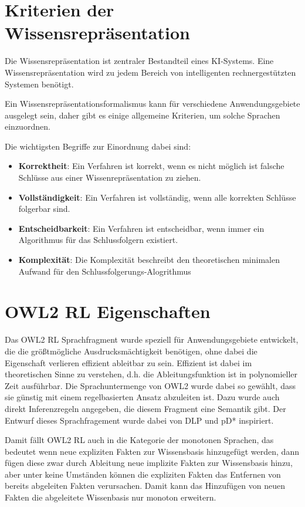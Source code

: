 \section{Kriterien der Wissensrepräsentation}

Die Wissensrepräsentation ist zentraler Bestandteil eines KI-Systems. Eine Wissensrepräsentation wird zu jedem Bereich von intelligenten rechnergestützten Systemen benötigt.

Ein Wissensrepräsentationsformalismus kann für verschiedene Anwendungsgebiete ausgelegt sein, daher gibt es einige allgemeine Kriterien, um solche Sprachen einzuordnen.

Die wichtigsten Begriffe zur Einordnung dabei sind:
\begin{itemize}
	\item \textbf{Korrektheit}:
Ein Verfahren ist korrekt, wenn es nicht möglich ist falsche Schlüsse aus einer Wissenrepräsentation zu ziehen.
	\item \textbf{Vollständigkeit}:
Ein Verfahren ist vollständig, wenn alle korrekten Schlüsse folgerbar sind.
	\item \textbf{Entscheidbarkeit}:
Ein Verfahren ist entscheidbar, wenn immer ein Algorithmus für das Schlussfolgern existiert.
	\item \textbf{Komplexität}:
Die Komplexität beschreibt den theoretischen minimalen Aufwand für den Schlussfolgerungs-Alogrithmus
\end{itemize}

\section{OWL2 RL Eigenschaften}
Das OWL2 RL Sprachfragment wurde speziell für Anwendungsgebiete entwickelt, die die größtmögliche Ausdrucksmächtigkeit benötigen, ohne dabei die Eigenschaft verlieren effizient ableitbar zu sein. Effizient ist dabei im theoretischen Sinne zu verstehen, d.h. die Ableitungsfunktion ist in polynomieller Zeit ausführbar. Die Sprachuntermenge von OWL2 wurde dabei so gewählt, dass sie günstig mit einem regelbasierten Ansatz abzuleiten ist. Dazu wurde auch direkt Inferenzregeln angegeben, die diesem Fragment eine Semantik gibt. Der Entwurf dieses Sprachfragement wurde dabei von DLP \cite{Grosof2003} und pD* \cite{Li2006} inspiriert.

Damit fällt OWL2 RL auch in die Kategorie der monotonen Sprachen, das bedeutet wenn neue expliziten Fakten zur Wissensbasis hinzugefügt werden, dann fügen diese zwar durch Ableitung neue implizite Fakten zur Wissensbasis hinzu, aber unter keine Umständen können die expliziten Fakten das Entfernen von bereits abgeleiten Fakten verursachen. Damit kann das Hinzufügen von neuen Fakten die abgeleitete Wissenbasis nur monoton erweitern.

